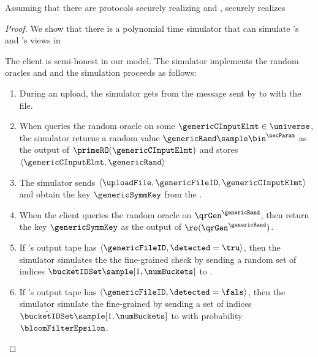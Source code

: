 
\begin{theorem}
Assuming that there are protocols securely realizing \distSigningFunc and \authOPRFFunc, \protocolEM securely realizes \contentModFunc \end{theorem}

\begin{proof}

We show that there is a polynomial time simulator that can simulate \client's and \server's views in \protocolEM

%
The client is semi-honest in our model. The simulator implements the random oracles \primeRO and \ro and the simulation proceeds as follows: 

\begin{enumerate}
\item During an upload, the simulator gets \genericFileID from the message sent by \client to \server with the file.  
\item When \client queries the random oracle \primeRO  on some $\genericCInputElmt \in \universe$, the simulator returns a random value $\genericRand \sample \bin^{\secParam}$ as the output of $\primeRO(\genericCInputElmt)$ and stores $\langle \genericCInputElmt, \genericRand \rangle$ 
\item  The simulator sends $\langle \uploadFile, \genericFileID, \genericCInputElmt \rangle$ and obtain the key
$\genericSymmKey$ from the \contentModFunc. 
\item When the client queries the random oracle \ro on $\qrGen^{\genericRand}$, then return the key $\genericSymmKey$ as the output of $\ro(\qrGen^{\genericRand})$. 
\item If \client's output tape has $\langle \genericFileID, \detected = \tru \rangle$, then the simulator simulates the the fine-grained check by sending a random set of indices $\hat{\bucketIDSet} \sample [1, \numBuckets]$ to \client. 
\item If \client's output tape has $\langle \genericFileID, \detected = \fals \rangle$, then the simulator simulate the fine-grained by sending a set of indices $\hat{\bucketIDSet} \sample [1, \numBuckets]$ to \client with probability $\bloomFilterEpsilon$. 
\end{enumerate}




\end{proof}
